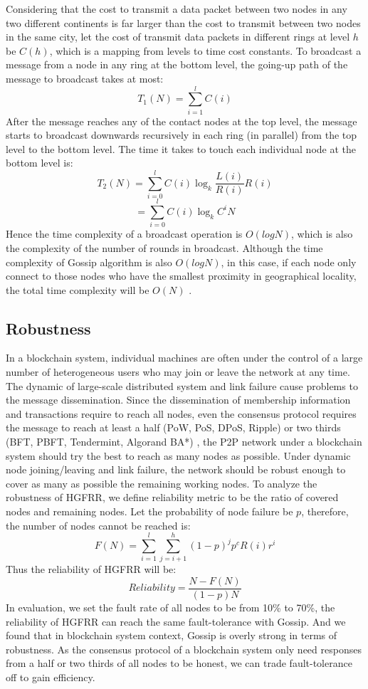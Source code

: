 Considering that the cost to transmit a data packet between two nodes in any two different continents is far larger than the cost to transmit between two nodes in the same city, let the cost of transmit data packets in different rings at level $h$ be $C(h)$, which is a mapping from levels to time cost constants. 
To broadcast a message from a node in any ring at the bottom level, the going-up path of the message to broadcast takes at most: $$T_1(N) = \sum_{i=1}^{l}C(i)$$
After the message reaches any of the contact nodes at the top level, the message starts to broadcast downwards recursively in each ring (in parallel) from the top level to the bottom level. The time it takes to touch each individual node at the bottom level is: $$T_2(N) = \sum_{i=0}^{l}C(i)\log_{k}{\frac{L(i)}{R(i)}}R(i)$$ $$= \sum_{i=0}^{l}C(i)\log_{k}{C^iN}$$
Hence the time complexity of a broadcast operation is $O(logN)$, which is also the complexity of the number of rounds in broadcast. Although the time complexity of Gossip algorithm is also $O(logN)$, in this case, if each node only connect to those nodes who have the smallest proximity in geographical locality, the total time complexity will be $O(N)$ \cite{kashyap2006efficient, kaune2008embracing}.

\subsection{Robustness}

In a blockchain system, individual machines are often under the control of a large number of heterogeneous users who may join or leave the network at any time. The dynamic of large-scale distributed system and link failure cause problems to the message dissemination. Since the dissemination of membership information and transactions require to reach all nodes, even the consensus protocol requires the message to reach at least a half (PoW, PoS, DPoS, Ripple) or two thirds (BFT, PBFT, Tendermint, Algorand BA*) \cite{zheng2016blockchain}, the P2P network under a blockchain system should try the best to reach as many nodes as possible. Under dynamic node joining/leaving and link failure, the network should be robust enough to cover as many as possible the remaining working nodes.
To analyze the robustness of HGFRR, we define reliability metric to be the ratio of covered nodes and remaining nodes. Let the probability of node failure be $p$, therefore, the number of nodes cannot be reached is: $$F(N)=\sum_{i=1}^{l} \sum_{j=i+1}^{h}(1-p)^jp^cR(i)r^{i}$$
Thus the reliability of HGFRR will be: $$Reliability = \frac{N-F(N)}{(1-p)N}$$
In evaluation, we set the fault rate of all nodes to be from 10\% to 70\%, the reliability of HGFRR can reach the same fault-tolerance with Gossip. And we found that in blockchain system context, Gossip is overly strong in terms of robustness. As the consensus protocol of a blockchain system only need responses from a half or two thirds of all nodes to be honest, we can trade fault-tolerance off to gain efficiency.